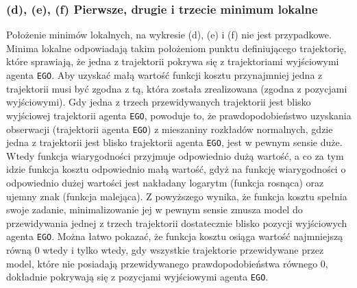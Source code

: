 \subsubsection{(d), (e), (f) Pierwsze, drugie i trzecie minimum lokalne}
Położenie minimów lokalnych, na wykresie (d), (e) i (f) nie jest przypadkowe. Minima lokalne odpowiadają takim położeniom punktu definiującego trajektorię, które sprawiają, że jedna z trajektorii pokrywa się z trajektoriami wyjściowymi agenta \texttt{EGO}. Aby uzyskać małą wartość funkcji kosztu przynajmniej jedna z trajektorii musi być zgodna z tą, która została zrealizowana (zgodna z pozycjami wyjściowymi). Gdy jedna z trzech przewidywanych trajektorii jest blisko wyjściowej trajektorii agenta \texttt{EGO}, powoduje to, że prawdopodobieństwo uzyskania obserwacji (trajektorii agenta \texttt{EGO}) z mieszaniny rozkładów normalnych, gdzie jedna z trajektorii jest blisko trajektorii agenta \texttt{EGO}, jest w pewnym sensie duże. Wtedy funkcja wiarygodności przyjmuje odpowiednio dużą wartość, a co za tym idzie funkcja kosztu odpowiednio małą wartość, gdyż na funkcję wiarygodności o odpowiednio dużej wartości jest nakładany logarytm (funkcja rosnąca) oraz ujemny znak (funkcja malejąca). Z powyższego wynika, że funkcja kosztu spełnia swoje zadanie, minimalizowanie jej w pewnym sensie zmusza model do przewidywania jednej z trzech trajektorii dostatecznie blisko pozycji wyjściowych agenta \texttt{EGO}. Można łatwo pokazać, że funkcja kosztu osiąga wartość najmniejszą równą 0 wtedy i tylko wtedy, gdy wszystkie trajektorie przewidywane przez model, które nie posiadają przewidywanego prawdopodobieństwa równego 0, dokładnie pokrywają się z pozycjami wyjściowymi agenta \texttt{EGO}.